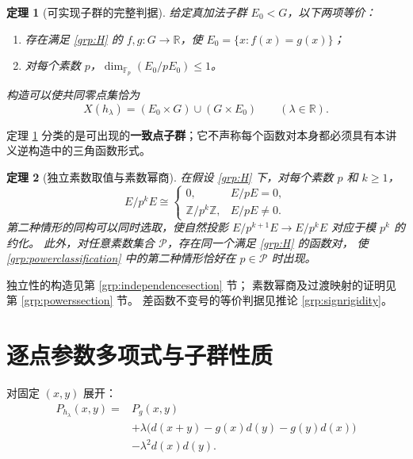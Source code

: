\documentclass[11pt,a4paper,oneside,openany]{book}
\theoremstyle{lecture}
\newtheorem{theorem}{定理}[section]
\newcommand{\R}{\mathbb R}
\newcommand{\Z}{\mathbb Z}
\newcommand{\Fp}{\mathbb F_p}
\newcommand{\rk}{\operatorname{dim}}
\numberwithin{equation}{section}
\begin{document}
\begin{theorem}[可实现子群的完整判据]\label{grp:converse}
给定真加法子群 $E_0<G$，以下两项等价：
\begin{enumerate}
\item 存在满足 \eqref{grp:H} 的 $f,g:G\to\R$，使
$E_0=\{x:f(x)=g(x)\}$；
\item 对每个素数 $p$，$\rk_{\Fp}(E_0/pE_0)\le1$。
\end{enumerate}
构造可以使共同零点集恰为
\begin{equation}\label{grp:modelzero}
 X(h_\lambda)=(E_0\times G)\cup(G\times E_0)
 \qquad(\lambda\in\R).
\end{equation}
\end{theorem}

定理 \ref{grp:converse} 分类的是可出现的\textbf{一致点子群}；它不声称每个函数对本身都必须具有本讲义逆构造中的三角函数形式。

\begin{theorem}[独立素数取值与素数幂商]\label{grp:powersmain}
在假设 \eqref{grp:H} 下，对每个素数 $p$ 和 $k\ge1$，
\begin{equation}\label{grp:powerclassification}
 E/p^kE\cong
 \begin{cases}
 0,&E/pE=0,\\
 \Z/p^k\Z,&E/pE\ne0.
 \end{cases}
\end{equation}
第二种情形的同构可以同时选取，使自然投影
$E/p^{k+1}E\to E/p^kE$ 对应于模 $p^k$ 的约化。
此外，对任意素数集合 $\mathcal P$，存在同一个满足 \eqref{grp:H} 的函数对，
使 \eqref{grp:powerclassification} 中的第二种情形恰好在 $p\in\mathcal P$ 时出现。
\end{theorem}

独立性的构造见第 \ref{grp:independencesection} 节；
素数幂商及过渡映射的证明见第 \ref{grp:powerssection} 节。
差函数不变号的等价判据见推论 \ref{grp:signrigidity}。

\section{逐点参数多项式与子群性质}

对固定 $(x,y)$ 展开：
\begin{equation}\label{grp:poly}
\begin{split}
 P_{h_\lambda}(x,y)
 ={}&P_g(x,y)\\
 &+\lambda\bigl(d(x+y)-g(x)d(y)-g(y)d(x)\bigr)\\
 &-\lambda^2d(x)d(y).
\end{split}
\end{equation}
\end{document}
